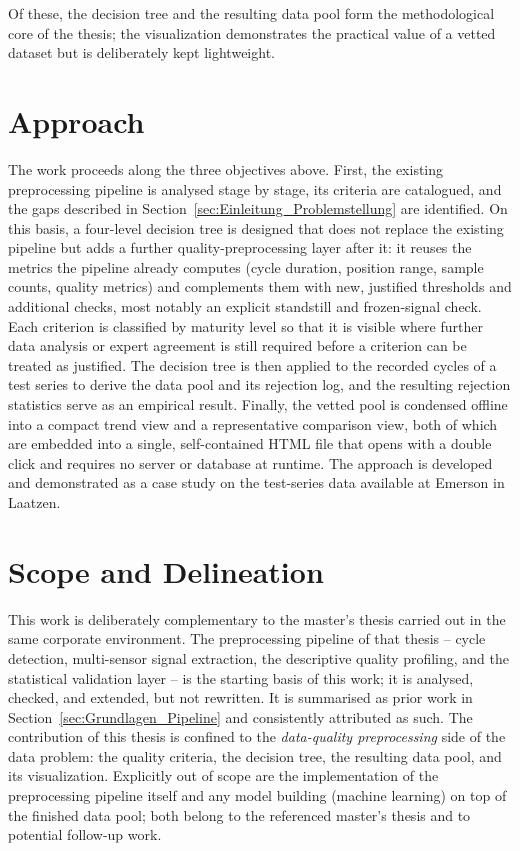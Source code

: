 Of these, the decision tree and the resulting data pool form the methodological core of
the thesis; the visualization demonstrates the practical value of a vetted dataset but is
deliberately kept lightweight.

\section{Approach}
\label{sec:Einleitung_Vorgehen}

The work proceeds along the three objectives above. First, the existing preprocessing
pipeline is analysed stage by stage, its criteria are catalogued, and the gaps described
in Section~\ref{sec:Einleitung_Problemstellung} are identified. On this basis, a
four-level decision tree is designed that does not replace the existing pipeline but adds
a further quality-preprocessing layer after it: it reuses the metrics the pipeline already
computes (cycle duration, position range, sample counts, quality metrics) and complements
them with new, justified thresholds and additional checks, most notably an explicit
standstill and frozen-signal check. Each criterion is classified by maturity level so
that it is visible where further data analysis or expert agreement is still required
before a criterion can be treated as justified. The decision tree is then applied to the
recorded cycles of a test series to derive the data pool and its rejection log, and the
resulting rejection statistics serve as an empirical result. Finally, the vetted pool is
condensed offline into a compact trend view and a representative comparison view, both of
which are embedded into a single, self-contained HTML file that opens with a double click
and requires no server or database at runtime. The approach is developed and demonstrated
as a case study on the test-series data available at Emerson in Laatzen.

\section{Scope and Delineation}
\label{sec:Einleitung_Abgrenzung}

This work is deliberately complementary to the master's thesis carried out in the same
corporate environment. The preprocessing pipeline of that thesis -- cycle detection,
multi-sensor signal extraction, the descriptive quality profiling, and the statistical
validation layer -- is the starting basis of this work; it is analysed, checked, and
extended, but not rewritten. It is summarised as prior work in
Section~\ref{sec:Grundlagen_Pipeline} and consistently attributed as such. The
contribution of this thesis is confined to the \emph{data-quality preprocessing} side of
the data problem: the quality criteria, the decision tree, the resulting data pool, and
its visualization. Explicitly out of scope are the implementation of the preprocessing
pipeline itself and any model building (machine learning) on top of the finished data
pool; both belong to the referenced master's thesis and to potential follow-up work.

